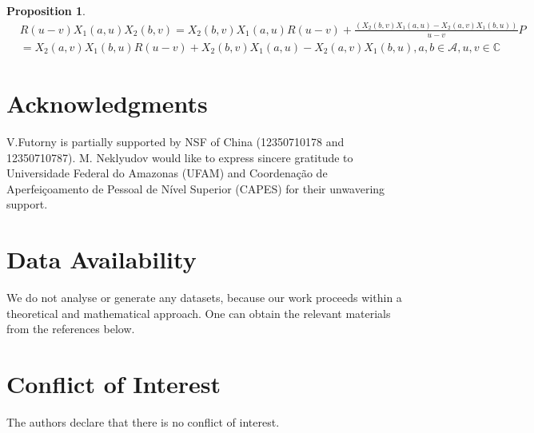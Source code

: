 \documentclass[10pt]{article}%
\numberwithin{equation}{section}
\newtheorem{prop}[thm]{Proposition}
\newtheorem{defin}[thm]{Definition}
\begin{document}
%
%
\begin{prop}\label{prop:RTTpolar}
\begin{eqnarray}\label{eqn:RTTpolar_1}
&R(u-v)X_1(a,u)X_2(b,v)=X_2(b,v)X_1(a,u)R(u-v)+\frac{(X_2(b,v)X_1(a,u)-X_2(a,v)X_1(b,u))}{u-v}P\nonumber\\
&=X_2(a,v)X_1(b,u)R(u-v)+X_2(b,v)X_1(a,u)-X_2(a,v)X_1(b,u)
,a,b\in\mathcal{A},u,v\in\mathbb{C}\nonumber
\end{eqnarray}
\end{prop}
%
\section{Acknowledgments}
\noindent V.Futorny is partially supported by NSF of China (12350710178 and 12350710787). 
M. Neklyudov would like to express sincere gratitude to Universidade Federal do Amazonas (UFAM) and Coordenação de Aperfeiçoamento de Pessoal de Nível Superior (CAPES) for their unwavering support.

\section{Data Availability}

We do not analyse or generate any datasets, because our work proceeds within a theoretical and mathematical approach. One can obtain the relevant materials from the references below.

\section{Conflict of Interest}

The authors declare that there is no conflict of interest.
\end{document}
